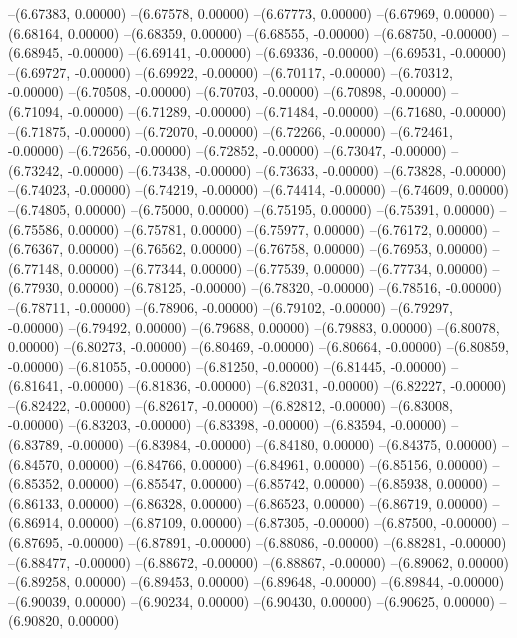 --(6.67383, 0.00000)
--(6.67578, 0.00000)
--(6.67773, 0.00000)
--(6.67969, 0.00000)
--(6.68164, 0.00000)
--(6.68359, 0.00000)
--(6.68555, -0.00000)
--(6.68750, -0.00000)
--(6.68945, -0.00000)
--(6.69141, -0.00000)
--(6.69336, -0.00000)
--(6.69531, -0.00000)
--(6.69727, -0.00000)
--(6.69922, -0.00000)
--(6.70117, -0.00000)
--(6.70312, -0.00000)
--(6.70508, -0.00000)
--(6.70703, -0.00000)
--(6.70898, -0.00000)
--(6.71094, -0.00000)
--(6.71289, -0.00000)
--(6.71484, -0.00000)
--(6.71680, -0.00000)
--(6.71875, -0.00000)
--(6.72070, -0.00000)
--(6.72266, -0.00000)
--(6.72461, -0.00000)
--(6.72656, -0.00000)
--(6.72852, -0.00000)
--(6.73047, -0.00000)
--(6.73242, -0.00000)
--(6.73438, -0.00000)
--(6.73633, -0.00000)
--(6.73828, -0.00000)
--(6.74023, -0.00000)
--(6.74219, -0.00000)
--(6.74414, -0.00000)
--(6.74609, 0.00000)
--(6.74805, 0.00000)
--(6.75000, 0.00000)
--(6.75195, 0.00000)
--(6.75391, 0.00000)
--(6.75586, 0.00000)
--(6.75781, 0.00000)
--(6.75977, 0.00000)
--(6.76172, 0.00000)
--(6.76367, 0.00000)
--(6.76562, 0.00000)
--(6.76758, 0.00000)
--(6.76953, 0.00000)
--(6.77148, 0.00000)
--(6.77344, 0.00000)
--(6.77539, 0.00000)
--(6.77734, 0.00000)
--(6.77930, 0.00000)
--(6.78125, -0.00000)
--(6.78320, -0.00000)
--(6.78516, -0.00000)
--(6.78711, -0.00000)
--(6.78906, -0.00000)
--(6.79102, -0.00000)
--(6.79297, -0.00000)
--(6.79492, 0.00000)
--(6.79688, 0.00000)
--(6.79883, 0.00000)
--(6.80078, 0.00000)
--(6.80273, -0.00000)
--(6.80469, -0.00000)
--(6.80664, -0.00000)
--(6.80859, -0.00000)
--(6.81055, -0.00000)
--(6.81250, -0.00000)
--(6.81445, -0.00000)
--(6.81641, -0.00000)
--(6.81836, -0.00000)
--(6.82031, -0.00000)
--(6.82227, -0.00000)
--(6.82422, -0.00000)
--(6.82617, -0.00000)
--(6.82812, -0.00000)
--(6.83008, -0.00000)
--(6.83203, -0.00000)
--(6.83398, -0.00000)
--(6.83594, -0.00000)
--(6.83789, -0.00000)
--(6.83984, -0.00000)
--(6.84180, 0.00000)
--(6.84375, 0.00000)
--(6.84570, 0.00000)
--(6.84766, 0.00000)
--(6.84961, 0.00000)
--(6.85156, 0.00000)
--(6.85352, 0.00000)
--(6.85547, 0.00000)
--(6.85742, 0.00000)
--(6.85938, 0.00000)
--(6.86133, 0.00000)
--(6.86328, 0.00000)
--(6.86523, 0.00000)
--(6.86719, 0.00000)
--(6.86914, 0.00000)
--(6.87109, 0.00000)
--(6.87305, -0.00000)
--(6.87500, -0.00000)
--(6.87695, -0.00000)
--(6.87891, -0.00000)
--(6.88086, -0.00000)
--(6.88281, -0.00000)
--(6.88477, -0.00000)
--(6.88672, -0.00000)
--(6.88867, -0.00000)
--(6.89062, 0.00000)
--(6.89258, 0.00000)
--(6.89453, 0.00000)
--(6.89648, -0.00000)
--(6.89844, -0.00000)
--(6.90039, 0.00000)
--(6.90234, 0.00000)
--(6.90430, 0.00000)
--(6.90625, 0.00000)
--(6.90820, 0.00000)
